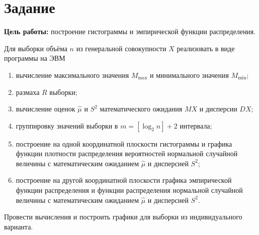 \chapter{Задание}

\textbf{Цель работы:} построение гистограммы и эмпирической функции распределения.


Для выборки объёма $n$ из генеральной совокупности $X$ реализовать в виде программы на ЭВМ
        \begin{enumerate}\begin{enumerate}
            \item вычисление максимального значения $M_{\max}$ и минимального значения $M_{\min}$;
            \item размаха $R$ выборки;
            \item вычисление оценок $\hat\mu$ и $S^2$ математического ожидания $MX$ и дисперсии $DX$;
            \item группировку значений выборки в $m = [\log_2 n] + 2$ интервала;
            \item построение на одной координатной плоскости гистограммы и графика функции плотности распределения вероятностей нормальной случайной величины с математическим ожиданием $\hat{\mu}$ и дисперсией $S^2$;
            \item построение на другой координатной плоскости графика эмпирической функции распределения и функции распределения нормальной случайной величины с математическим ожиданием $\hat{\mu}$ и дисперсией $S^2$.
        \end{enumerate}\end{enumerate}
Провести вычисления и построить графики для выборки из индивидуального варианта.



